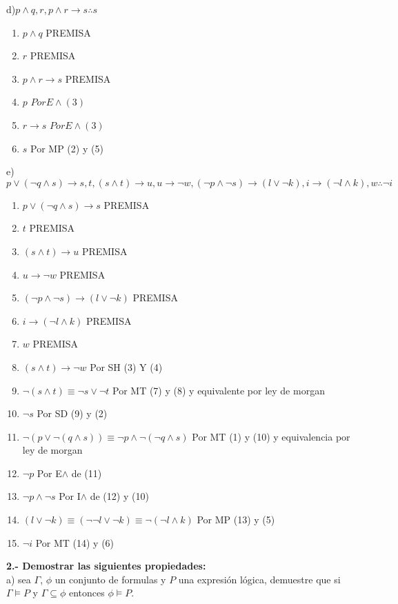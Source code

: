 \documentclass[paper=letter, fontsize=12pt]{scrartcl}
\begin{document}
d)$p\wedge q, r, p\wedge r\rightarrow s \therefore s$\\
\begin{enumerate}
	\item$p\wedge q$ PREMISA
	\item$r$ PREMISA
	\item$p\wedge r\rightarrow s$ PREMISA
	\item$p $ $Por E\wedge (3)$
	\item$r\rightarrow s$ $Por E\wedge (3)$
	\item$s$ Por MP (2) y (5)
\end{enumerate}

e)$p\vee(\neg q \wedge s)\rightarrow s, t, (s\wedge t)\rightarrow u, u\rightarrow \neg w, (\neg p \wedge \neg s)\rightarrow (l \vee \neg k), i \rightarrow (\neg l \wedge k), w \therefore \neg i$\\
\begin{enumerate}
	\item$p\vee(\neg q \wedge s)\rightarrow s$ PREMISA
	\item$t$ PREMISA
	\item$(s\wedge t)\rightarrow u$ PREMISA
	\item$u\rightarrow \neg w$ PREMISA
	\item$(\neg p \wedge \neg s)\rightarrow (l \vee \neg k)$ PREMISA
	\item$i \rightarrow (\neg l \wedge k)$ PREMISA
	\item$w$ PREMISA
	\item$(s\wedge t)\rightarrow \neg w$ Por SH (3) Y (4)
	\item$\neg (s\wedge t)\equiv \neg s \vee \neg t$ Por MT (7) y (8) y equivalente por ley de morgan
	\item$\neg s$ Por SD (9) y (2)
	\item$\neg(p \vee \neg(q \wedge s)) \equiv \neg p \wedge \neg (\neg q \wedge s)$ Por MT (1) y (10) y equivalencia por ley de morgan
	\item$\neg p$ Por E$\wedge$ de (11)
	\item$\neg p \wedge \neg s$ Por I$\wedge$ de (12) y (10)
	\item$(l\vee \neg k)\equiv (\neg \neg l \vee \neg k)\equiv \neg(\neg l \wedge k)$ Por MP (13) y (5)
	\item$\neg i$ Por MT (14) y (6)
\end{enumerate}

{\bf 2.- Demostrar las siguientes propiedades:}\\
a) sea $\Gamma$, $\phi$ un conjunto de formulas y $P$ una expresión lógica, demuestre que si $\Gamma \models P$ y $\Gamma \subseteq \phi$ entonces $\phi \models P$.\\
\end{document}
